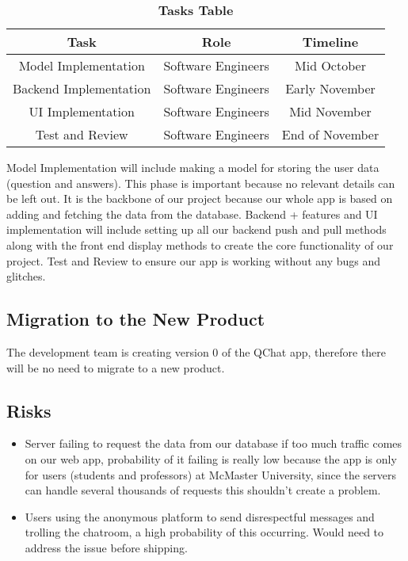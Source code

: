 \documentclass[12pt, titlepage]{article}
\begin{document}
\begin{table}[H]
\centering
\begin{tabular}{|c|c|c|} \hline
 \textbf{Task} & \textbf{Role} &  \textbf{Timeline} \\ \hline
 Model Implementation & Software Engineers & Mid October \\\hline
 Backend Implementation & Software Engineers & Early November \\\hline
 UI Implementation & Software Engineers & Mid November \\\hline
 Test and Review & Software Engineers & End of November \\\hline
\end{tabular}
\caption{\bf Tasks Table}
\label{TeamMemberRoles}
\end{table} 

Model Implementation will include making a model for storing the user data (question and answers). This phase is important because no relevant details can be left out. It is the backbone of our project because our whole app is based on adding and fetching the data from the database. Backend + features and UI implementation will include setting up all our backend push and pull methods along with the front end display methods to create the core functionality of our project. Test and Review to ensure our app is working without any bugs and glitches.

\subsection{Migration to the New Product}
The development team is creating version 0 of the QChat app, therefore there will be no need to migrate to a new product.

\subsection{Risks}
\begin{itemize}
    \item Server failing to request the data from our database if too much traffic comes on our web app, probability of it failing is really low because the app is only for users (students and professors) at McMaster University, since the servers can handle several thousands of requests this shouldn’t create a problem.
    \item Users using the anonymous platform to send disrespectful messages and trolling the chatroom, a high probability of this occurring. Would need to address the issue before shipping.
\end{itemize}
\end{document}
